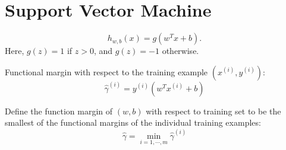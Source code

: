 \documentclass[UTF8]{ctexart}
\begin{document}
	\section{Support Vector Machine}
	\begin{equation*}
		h_{w, b}(x) = g(w^Tx + b).
	\end{equation*}
	Here, $g(z)=1$ if $z>0$, and $g(z)=-1$ otherwise.
	
	Functional margin with respect to the training example $(x^{(i)}, y^{(i)})$:
	\begin{equation*}
		\hat{\gamma}^{(i)} = y^{(i)}(w^Tx^{(i)} + b)
	\end{equation*}
	
	Define the function margin of $(w, b)$ with respect to training set to be the smallest of the functional margins of the individual training examples:
	\begin{equation*}
		\hat{\gamma} = \min_{i=1,\cdots,m}\hat{\gamma}^{(i)}
	\end{equation*}
	
	
\end{document}
